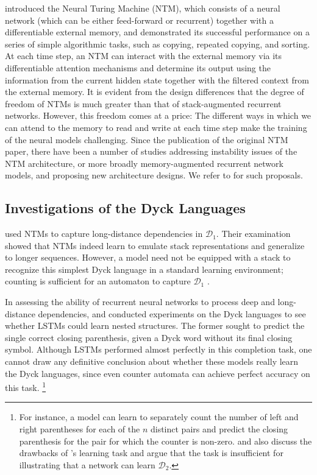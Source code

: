 \documentclass[11pt,a4paper]{article}
\theoremstyle{plain}
\newcommand{\dyck}[1]{\ensuremath{\mathcal{D}_{#1}}}
\begin{document}
\citet{graves2014neural} introduced the Neural Turing Machine (NTM), which consists of a neural network (which can be either feed-forward or recurrent) together with a differentiable external memory, and demonstrated its successful performance on a series of simple algorithmic tasks, such as copying, repeated copying, and sorting. At each time step, an NTM can interact with the external memory via its differentiable attention mechanisms and determine its output using the information from the current hidden state together with the filtered context from the external memory. It is evident from the design differences that the degree of freedom of NTMs is much greater than that of stack-augmented recurrent networks. However, this freedom comes at a price: The different ways in which we can attend to the memory to read and write at each time step make the training of the neural models challenging. Since the publication of the original NTM paper, there have been a number of studies addressing instability issues of the NTM architecture, or more broadly memory-augmented recurrent network models, and proposing new architecture designs. We refer to \citet{zaremba2015reinforcement, kurach2015neural, yang2016lie,graves2016hybrid, gulcehre2018dynamic} for such proposals.

\vspace{-0.6em}
 \subsection{Investigations of the Dyck Languages}\label{sec:related-dyck}
 \vspace{-0.2em}
\citet{deleu2016learning} used NTMs to capture long-distance dependencies in \dyck{1}. Their examination showed that NTMs indeed learn to emulate stack representations and generalize to longer sequences. However, a model need not be equipped with a stack to recognize this simplest Dyck language in a standard learning environment; counting is sufficient for an automaton to capture \dyck{1} \citep{suzgun-etal-2019-lstm, yu-etal-2019-learning}. 

In assessing the ability of recurrent neural networks to process deep and long-distance dependencies, \citet{skachkova2018closing} and \citet{sennhauser2018evaluating} conducted experiments on the Dyck languages to see whether LSTMs could learn nested structures. The former sought to predict the single correct closing parenthesis, given a Dyck word without its final closing symbol. Although LSTMs performed almost perfectly in this completion task, one cannot draw any definitive conclusion about whether these models really learn the Dyck languages, since even counter automata can achieve perfect accuracy on this task.%
%
\footnote{For instance, a model can learn to separately count the number of left and right parentheses for each of the $n$ distinct pairs and predict the closing parenthesis for the pair for which the counter is non-zero. \citet{suzgun-etal-2019-lstm} and \citet{yu-etal-2019-learning} also discuss the drawbacks of \citeauthor{skachkova2018closing}'s learning task and argue that the task is insufficient for illustrating that a network can learn \dyck{2}.}
\end{document}
